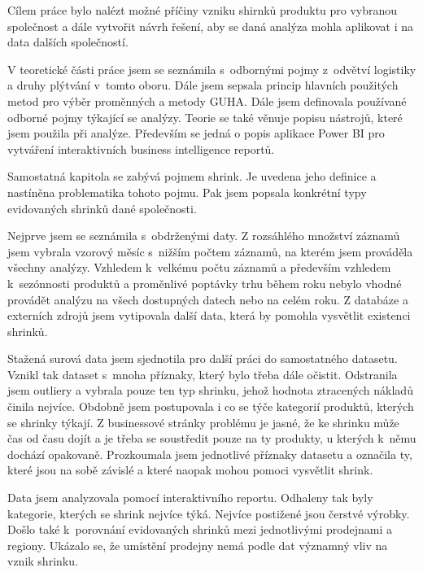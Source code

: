 Cílem práce bylo nalézt možné příčiny vzniku shirnků produktu pro vybranou společnost a dále vytvořit návrh řešení, aby se daná analýza mohla aplikovat i na data dalších společností.

V teoretické části práce jsem se seznámila s~odbornými pojmy z~odvětví logistiky a druhy plýtvání v~tomto oboru. Dále jsem sepsala princip hlavních použitých metod pro výběr proměnných a metody GUHA. Dále jsem definovala používané odborné pojmy týkající se analýzy. Teorie se také věnuje popisu nástrojů, které jsem použila při analýze. Především se jedná o popis aplikace Power BI pro vytváření interaktivních business intelligence reportů.

Samostatná kapitola se zabývá pojmem shrink. Je uvedena jeho definice a nastíněna problematika tohoto pojmu. Pak jsem popsala konkrétní typy evidovaných shrinků dané společnosti.

Nejprve jsem se seznámila s~obdrženými daty. Z rozsáhlého množství záznamů jsem vybrala vzorový měsíc s~nižším počtem záznamů, na kterém jsem prováděla všechny analýzy. Vzhledem k~velkému počtu záznamů a především vzhledem k~sezónnosti produktů a proměnlivé poptávky trhu během roku nebylo vhodné provádět analýzu na všech dostupných datech nebo na celém roku. Z databáze a externích zdrojů jsem vytipovala další data, která by pomohla vysvětlit existenci shrinků.

Stažená surová data jsem sjednotila pro další práci do samostatného datasetu. Vznikl tak dataset s~mnoha příznaky, který bylo třeba dále očistit. Odstranila jsem outliery a vybrala pouze ten typ shrinku, jehož hodnota ztracených nákladů činila nejvíce. Obdobně jsem postupovala i co se týče kategorií produktů, kterých se shrinky týkají. Z businessové stránky problému je jasné, že ke shrinku může čas od času dojít a je třeba se soustředit pouze na ty produkty, u kterých k~němu dochází opakovaně. 
Prozkoumala jsem jednotlivé příznaky datasetu a označila ty, které jsou na sobě závislé a které naopak mohou pomoci vysvětlit shrink. 

Data jsem analyzovala pomocí interaktivního reportu. Odhaleny tak byly kategorie, kterých se shrink nejvíce týká. Nejvíce postižené jsou čerstvé výrobky. Došlo také k~porovnání evidovaných shrinků mezi jednotlivými prodejnami a regiony. Ukázalo se, že umístění prodejny nemá podle dat významný vliv na vznik shrinku. 


